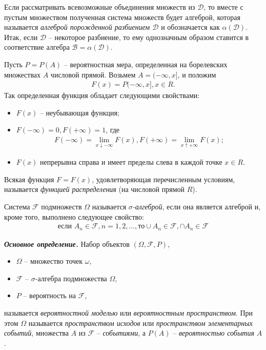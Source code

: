 \begin{enumerate}
Если рассматривать всевозможные объединения множеств из $\mathcal{D}$, то вместе с пустым множеством полученная система множеств будет алгеброй, которая называется \textit{алгеброй порожденной разбиением $\mathcal{D}$} и обозначается как $\alpha(\mathcal{D})$. Итак, если $\mathcal{D}$ -- некоторое разбиение, то ему однозначным образом ставится в соответствие алгебра $\mathcal{B} = \alpha(\mathcal{D})$.

Пусть $P = P(A)$ -- вероятностная мера, определенная на борелевских множествах $A$ числовой прямой. Возьмем $A = (-\infty, x]$, и положим
\begin{align*}
F(x) = P(-\infty, x], x \in R.
\end{align*}
Так определенная функция обладает следующими свойствами:
\begin{itemize}
\item $F(x)$ -- неубывающая функция;
\item $F(- \infty) = 0, F(+ \infty) = 1$, где 
\begin{align*}
F(- \infty) = \lim_{x \downarrow - \infty} F(x), F(+ \infty) = \lim_{x \uparrow + \infty} F(x);
\end{align*} 
\item $F(x)$ непрерывна справа и имеет пределы слева в каждой точке $x \in R$.
\end{itemize}
\begin{definition}\label{mariyka_def_1} Всякая функция $F = F(x)$, удовлетворяющая перечисленным условиям, называется \textit{функцией распределения} (на числовой прямой $R$).
	\end{definition}

\begin{definition}\label{mariyka_def_2} Система $\mathcal{F}$ подмножеств $\Omega$ называется \textit{$\sigma$-алгеброй}, если она является алгеброй и, кроме того, выполнено следующее свойство:
\begin{align*}
\text{если } A_n \in \mathcal{F}, n = 1,2,..., \text{то} \cup A_n \in \mathcal{F}, \cap A_n \in \mathcal{F}
\end{align*}
\end{definition}

\textbf{\textit{Основное определение.}} Набор объектов $(\Omega, \mathcal{F}, P)$,
\begin{itemize}
\item $\Omega$ -- множество точек $\omega$,
\item $\mathcal{F}$ -- $\sigma$-алгебра подмножества $\Omega$,
\item $P$ -- вероятность на $\mathcal{F}$,
\end{itemize}
называется \textit{вероятностной моделью} или \textit{вероятностным пространством}. При этом $\Omega$ называется \textit{пространством исходов} или \textit{пространством элементарных событий}, множества $A$ из $\mathcal{F}$ -- \textit{событиями}, а $P(A)$ -- \textit{вероятностью события} $A$.


\end{enumerate}

